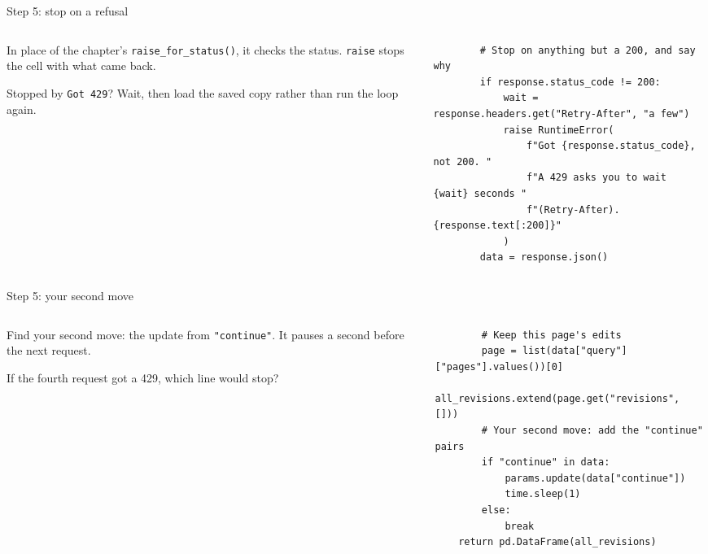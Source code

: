 \documentclass[9pt,aspectratio=169]{beamer}
\begin{document}
\begin{frame}[fragile]{Step 5: stop on a refusal}
    \begin{columns}[T]
        \begin{column}{0.37\textwidth}
            In place of the chapter's \texttt{raise\_for\_status()}, it checks the status. \texttt{raise} stops the cell with what came back.

            \medskip
            Stopped by \texttt{Got 429}? Wait, then load the saved copy rather than run the loop again.
        \end{column}
        \begin{column}{0.6\textwidth}
\begin{lstlisting}
        # Stop on anything but a 200, and say why
        if response.status_code != 200:
            wait = response.headers.get("Retry-After", "a few")
            raise RuntimeError(
                f"Got {response.status_code}, not 200. "
                f"A 429 asks you to wait {wait} seconds "
                f"(Retry-After). {response.text[:200]}"
            )
        data = response.json()
\end{lstlisting}
        \end{column}
    \end{columns}
\end{frame}

\begin{frame}[fragile]{Step 5: your second move}
    \begin{columns}[T]
        \begin{column}{0.37\textwidth}
            Find your second move: the update from \texttt{"continue"}. It pauses a second before the next request.

            \medskip
            If the fourth request got a 429, which line would stop?
        \end{column}
        \begin{column}{0.6\textwidth}
\begin{lstlisting}
        # Keep this page's edits
        page = list(data["query"]["pages"].values())[0]
        all_revisions.extend(page.get("revisions", []))
        # Your second move: add the "continue" pairs
        if "continue" in data:
            params.update(data["continue"])
            time.sleep(1)
        else:
            break
    return pd.DataFrame(all_revisions)
\end{lstlisting}
        \end{column}
    \end{columns}
\end{frame}
\end{document}
